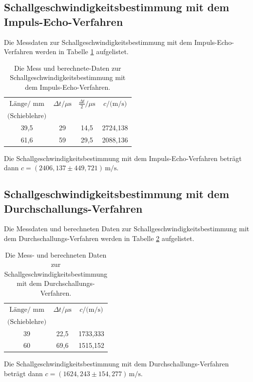 \subsection{Schallgeschwindigkeitsbestimmung mit dem Impuls-Echo-Verfahren}
Die Messdaten zur Schallgeschwindigkeitsbestimmung mit dem Impuls-Echo-Verfahren werden in Tabelle \ref{tab:Impuls} aufgelistet.
\begin{table}[H]
    \centering
    \caption{Die Mess und berechnete-Daten zur Schallgeschwindigkeitsbestimmung mit dem Impuls-Echo-Verfahren.}
    \label{tab:Impuls}
    \begin{tabular}{| c | c |c |c |}
    \hline
    $\text{Länge/ mm} $ &$\Delta t/ \mu \text{s}$&$\frac{\Delta t}{2}/ \mu \text{s}$ &$c/ \text{(m/s)}$\\
   $\text{(Schieblehre)}$& {}& {}& {}\\
    \hline
    39,5&29&14,5&2724,138 \\
    61,6&59&29,5&2088,136\\
    \hline
\end{tabular}
\end{table}
\noindent
Die Schallgeschwindigkeitsbestimmung mit dem Impuls-Echo-Verfahren beträgt dann $c= (2406,137\pm 449,721)\,\text{m/s}$.


\subsection{Schallgeschwindigkeitsbestimmung mit dem Durchschallungs-Verfahren}
 Die Messdaten \cite{1}  und berechneten Daten zur Schallgeschwindigkeitsbestimmung mit dem Durchschallungs-Verfahren werden in Tabelle \ref{tab:Durch} aufgelistet.
 \begin{table}[H]
    \centering
    \caption{Die Mess- und berechneten Daten zur Schallgeschwindigkeitsbestimmung mit dem Durchschallungs-Verfahren.}
    \label{tab:Durch}
    \begin{tabular}{| c | c |c |}
    \hline
    $\text{Länge/ mm} $ &$\Delta t/ \mu \text{s}$ &$c/ \text{(m/s)}$\\
   $\text{(Schieblehre)}$& {}& {}\\
    \hline
    39&22,5&1733,333 \\
    60&69,6&1515,152\\
    \hline
\end{tabular}
\end{table}
\noindent
Die Schallgeschwindigkeitsbestimmung mit dem Durchschallungs-Verfahren beträgt dann $c= (1624,243\pm 154,277)\,\text{m/s}$.


